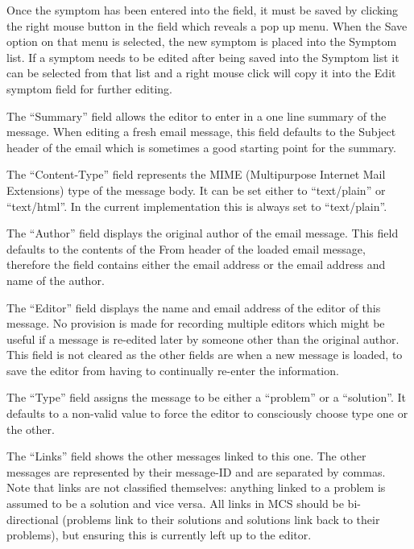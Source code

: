 Once the symptom has been entered into the field, it must be saved by clicking
the right mouse button in the field which reveals a pop up menu. When the Save
option on that menu is selected, the new symptom is placed into the Symptom
list. If a symptom needs to be edited after being saved into the Symptom list
it can be selected from that list and a right mouse click will copy it into the
Edit symptom field for further editing.

The ``Summary'' field allows the editor to enter in a one line summary of the
message. When editing a fresh email message, this field defaults to the Subject
header of the email which is sometimes a good starting point for the summary.

The ``Content-Type'' field represents the MIME (Multipurpose Internet Mail
Extensions) type of the message body. It can be set either to ``text/plain'' or
``text/html''. In the current implementation this is always set to
``text/plain''.

The ``Author'' field displays the original author of the email message. This
field defaults to the contents of the From header of the loaded email message,
therefore the field contains either the email address or the email address and
name of the author.

The ``Editor'' field displays the name and email address of the editor of this
message. No provision is made for recording multiple editors which might be
useful if a message is re-edited later by someone other than the original
author. This field is not cleared as the other fields are when a new message is
loaded, to save the editor from having to continually re-enter the information.

The ``Type'' field assigns the message to be either a ``problem'' or a
``solution''. It defaults to a non-valid value to force the editor to
consciously choose type one or the other.

The ``Links'' field shows the other messages linked to this one. The other
messages are represented by their message-ID and are separated by commas. Note
that links are not classified themselves: anything linked to a problem is
assumed to be a solution and vice versa. All links in MCS should be
bi-directional (problems link to their solutions and solutions link back to
their problems), but ensuring this is currently left up to the editor.

